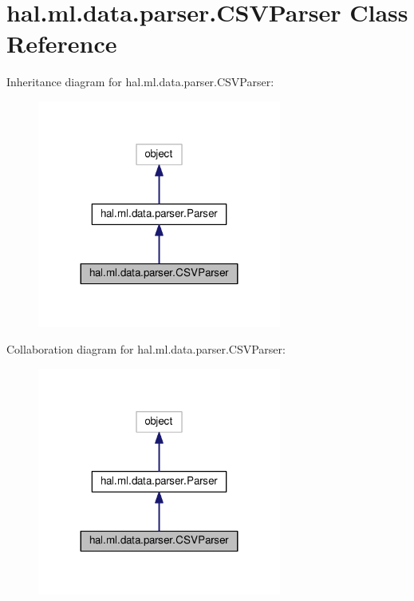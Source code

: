 \hypertarget{classhal_1_1ml_1_1data_1_1parser_1_1_c_s_v_parser}{}\section{hal.\+ml.\+data.\+parser.\+C\+S\+V\+Parser Class Reference}
\label{classhal_1_1ml_1_1data_1_1parser_1_1_c_s_v_parser}


Inheritance diagram for hal.\+ml.\+data.\+parser.\+C\+S\+V\+Parser\+:
\nopagebreak
\begin{figure}[H]
\begin{center}
\leavevmode
\includegraphics[width=227pt]{classhal_1_1ml_1_1data_1_1parser_1_1_c_s_v_parser__inherit__graph}
\end{center}
\end{figure}


Collaboration diagram for hal.\+ml.\+data.\+parser.\+C\+S\+V\+Parser\+:
\nopagebreak
\begin{figure}[H]
\begin{center}
\leavevmode
\includegraphics[width=227pt]{classhal_1_1ml_1_1data_1_1parser_1_1_c_s_v_parser__coll__graph}
\end{center}
\end{figure}
